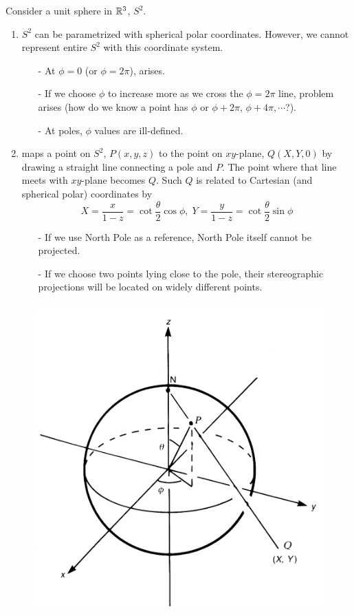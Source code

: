 \documentclass[a4paper, 10pt]{article}
\begin{document}
\begin{example}
    Consider a unit sphere in $\mathbb{R}^{3}$, $S^{2}$.
    \begin{enumerate}
        \item $S^{2}$ can be parametrized with spherical polar coordinates. However, we cannot represent entire $S^{2}$ with this coordinate system.
        \begin{itemize}
            \item[-] At $\phi = 0$ (or $\phi = 2\pi$),  arises.
            \item[-] If we choose $\phi$ to increase more as we cross the $\phi = 2\pi$ line,  problem arises (how do we know a point has $\phi$ or $\phi + 2\pi,\, \phi + 4\pi, \cdots$?).
            \item[-] At poles, $\phi$ values are ill-defined.
        \end{itemize}
        \item {} maps a point on $S^{2}$, $P(x,y,z)$ to the point on $xy$-plane, $Q(X,Y,0)$ by drawing a straight line connecting a pole and $P$. The point where that line meets with $xy$-plane becomes $Q$. Such $Q$ is related to Cartesian (and spherical polar) coordinates by
        \[ X = \frac{x}{1-z} = \cot\frac{\theta}{2}\cos\phi,\; Y = \frac{y}{1-z} = \cot\frac{\theta}{2}\sin\phi \]
        \begin{itemize}
            \item[-] If we use North Pole as a reference, North Pole itself cannot be projected.
            \item[-] If we choose two points lying close to the pole, their stereographic projections will be located on widely different points.
        \end{itemize}
    \end{enumerate}
\end{example}
\newpage


\begin{figure}[htbp!]
    \centering
    \includegraphics[width=0.5\linewidth]{../images/lecture03/3_01.png}
\end{figure}
\end{document}
